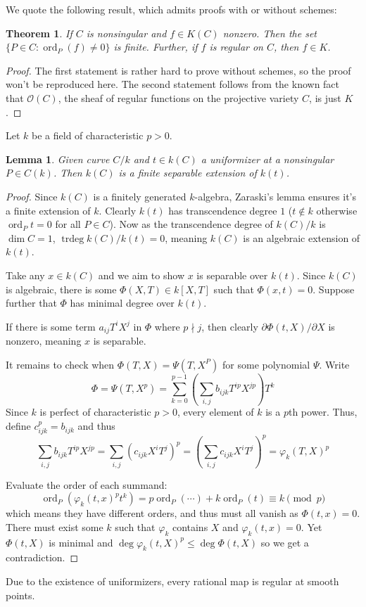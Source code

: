 \documentclass[12pt]{article}
\newtheorem{theorem}{Theorem}[subsection]
\newtheorem{lemma}{Lemma}[subsection]
\theoremstyle{remark}
\newcommand{\ord}[0]{\operatorname{ord}}
\newcommand{\trdeg}[0]{\operatorname{trdeg}}
\begin{document}
        We quote the following result, which admits proofs with or without schemes:
        \begin{theorem}
            If $C$ is nonsingular and $f\in K(C)$ nonzero. Then the set $\{P\in C:\ord_P(f)\neq 0\}$ is finite. Further, if $f$ is regular on $C$, then $f\in K$.
        \end{theorem}
        \begin{proof}
            The first statement is rather hard to prove without schemes, so the proof won't be reproduced here. The second statement follows from the known fact that $\mathscr O(C)$, the sheaf of regular functions on the projective variety $C$, is just $K$.
        \end{proof}

        
        Let $k$ be a field of characteristic $p>0$.
        \begin{lemma}\label{l122}
            Given curve $C/k$ and $t\in k(C)$ a uniformizer at a nonsingular $P\in C(k)$. Then $k(C)$ is a finite separable extension of $k(t)$.
        \end{lemma}
        \begin{proof}
            Since $k(C)$ is a finitely generated $k$-algebra, Zaraski's lemma ensures it's a finite extension of $k$. Clearly $k(t)$ has transcendence degree $1$ ($t\notin k$ otherwise $\ord_P t=0$ for all $P\in C$). Now as the transcendence degree of $k(C)/k$ is $\dim C=1$, $\trdeg k(C)/k(t)=0$, meaning $k(C)$ is an algebraic extension of $k(t)$.

            Take any $x\in k(C)$ and we aim to show $x$ is separable over $k(t)$. Since $k(C)$ is algebraic, there is some $\Phi(X, T)\in k[X, T]$ such that $\Phi(x, t)=0$. Suppose further that $\Phi$ has minimal degree over $k(t)$.

            If there is some term $a_{ij}T^iX^j$ in $\Phi$ where $p\nmid j$, then clearly $\partial\Phi(t, X)/\partial X$ is nonzero, meaning $x$ is separable.

            It remains to check when $\Phi(T, X)=\Psi(T, X^P)$ for some polynomial $\Psi$. Write
            \[\Phi=\Psi(T, X^p)=\sum_{k=0}^{p-1}\left(\sum_{i,j}b_{ijk}T^{ip}X^{jp}\right)T^k\]
            Since $k$ is perfect of characteristic $p>0$, every element of $k$ is a $p$th power. Thus, define $c_{ijk}^p=b_{ijk}$ and thus
            \[\sum_{i,j}b_{ijk}T^{ip}X^{jp}=\sum_{i,j}(c_{ijk}X^iT^j)^p=\left(\sum_{i,j}c_{ijk}X^iT^j\right)^p=\varphi_k(T, X)^p\]
            
            Evaluate the order of each summand:
            \[\ord_P(\varphi_k(t, x)^pt^k)=p\ord_P(\cdots)+k\ord_P(t)\equiv k\pmod{p}\]
            which means they have different orders, and thus must all vanish as $\Phi(t, x)=0$. There must exist some $k$ such that $\varphi_k$ contains $X$ and $\varphi_k(t, x)=0$. Yet $\Phi(t, X)$ is minimal and $\deg \varphi_k(t, X)^p\leqslant \deg \Phi(t, X)$ so we get a contradiction.
        \end{proof}

        Due to the existence of uniformizers, every rational map is regular at smooth points.
\end{document}
